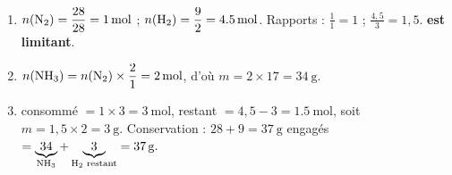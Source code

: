 \documentclass[11pt,a4paper]{article}
\begin{document}
\begin{corrige}
\begin{enumerate}[label=\alph*)]
  \item $n(\ce{N2})=\dfrac{28}{28}=\qty{1}{\mole}$ ; $n(\ce{H2})=\dfrac{9}{2}=\qty{4.5}{\mole}$.
        Rapports :  $\frac{1}{1}=1$ ;  $\frac{4,5}{3}=1,5$. \textbf{ est limitant}.
  \item $n(\ce{NH3})=n(\ce{N2})\times\dfrac{2}{1}=\qty{2}{\mole}$, d'où $m=2\times17=\qty{34}{\gram}.$
  \item {} consommé $=1\times3=\qty{3}{\mole}$, restant $=4,5-3=\qty{1.5}{\mole}$, soit
        $m=1,5\times2=\qty{3}{\gram}.$ Conservation : $28+9=\qty{37}{\gram}$ engagés
        $=\underbrace{34}_{\ce{NH3}}+\underbrace{3}_{\ce{H2}\text{ restant}}=\qty{37}{\gram}.$ \checkmark
\end{enumerate}
\end{corrige}
\end{document}
